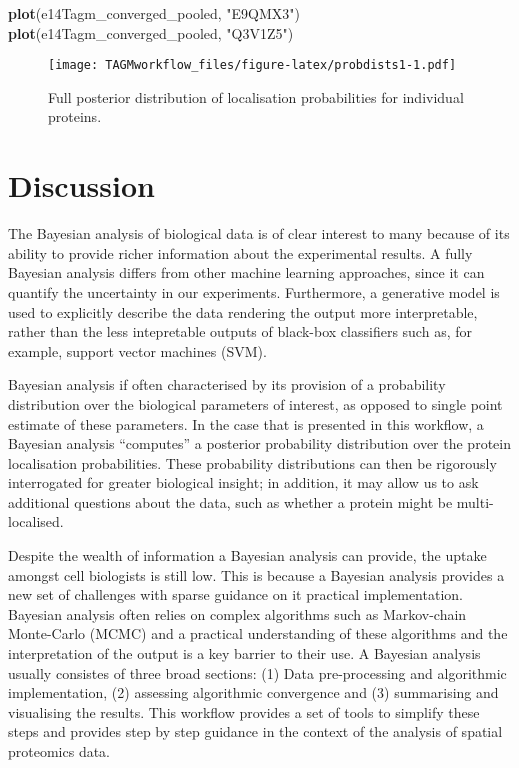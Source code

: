 \documentclass[]{article}
\newenvironment{Shaded}{\begin{snugshade}}{\end{snugshade}}
\newcommand{\KeywordTok}[1]{\textcolor[rgb]{0.13,0.29,0.53}{\textbf{{#1}}}}
\newcommand{\StringTok}[1]{\textcolor[rgb]{0.31,0.60,0.02}{{#1}}}
\newcommand{\NormalTok}[1]{{#1}}
\begin{document}
\begin{Shaded}
\begin{Highlighting}[]
\KeywordTok{plot}\NormalTok{(e14Tagm_converged_pooled, }\StringTok{"E9QMX3"}\NormalTok{)}
\KeywordTok{plot}\NormalTok{(e14Tagm_converged_pooled, }\StringTok{"Q3V1Z5"}\NormalTok{)}
\end{Highlighting}
\end{Shaded}

\begin{figure}[htbp]
\centering
\texttt{[image: TAGMworkflow\_files/figure-latex/probdists1-1.pdf]}
\caption{\label{fig:probdists1}Full posterior distribution of localisation
probabilities for individual proteins.}
\end{figure}

\section{Discussion}\label{discussion}

The Bayesian analysis of biological data is of clear interest to many
because of its ability to provide richer information about the
experimental results. A fully Bayesian analysis differs from other
machine learning approaches, since it can quantify the uncertainty in
our experiments. Furthermore, a generative model is used to explicitly
describe the data rendering the output more interpretable, rather than
the less intepretable outputs of black-box classifiers such as, for
example, support vector machines (SVM).

Bayesian analysis if often characterised by its provision of a
probability distribution over the biological parameters of interest, as
opposed to single point estimate of these parameters. In the case that
is presented in this workflow, a Bayesian analysis ``computes'' a
posterior probability distribution over the protein localisation
probabilities. These probability distributions can then be rigorously
interrogated for greater biological insight; in addition, it may allow
us to ask additional questions about the data, such as whether a protein
might be multi-localised.

Despite the wealth of information a Bayesian analysis can provide, the
uptake amongst cell biologists is still low. This is because a Bayesian
analysis provides a new set of challenges with sparse guidance on it
practical implementation. Bayesian analysis often relies on complex
algorithms such as Markov-chain Monte-Carlo (MCMC) and a practical
understanding of these algorithms and the interpretation of the output
is a key barrier to their use. A Bayesian analysis usually consistes of
three broad sections: (1) Data pre-processing and algorithmic
implementation, (2) assessing algorithmic convergence and (3)
summarising and visualising the results. This workflow provides a set of
tools to simplify these steps and provides step by step guidance in the
context of the analysis of spatial proteomics data.
\end{document}
